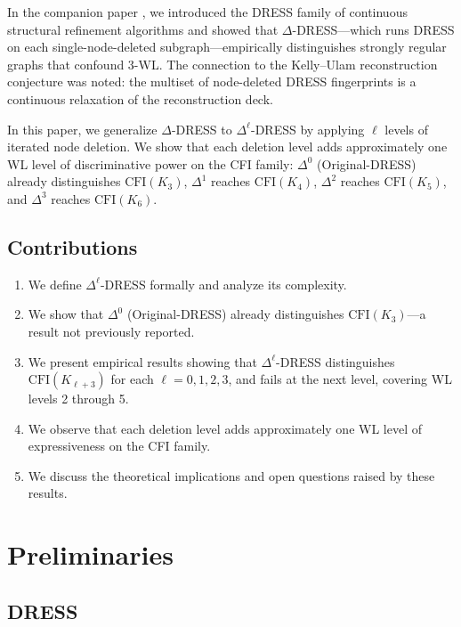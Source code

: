 \documentclass[11pt,a4paper]{article}
\begin{document}
In the companion paper \cite{castrillo2026dress}, we introduced the DRESS family of continuous structural refinement algorithms and showed that $\Delta$-DRESS---which runs DRESS on each single-node-deleted subgraph---empirically distinguishes strongly regular graphs that confound 3-WL. The connection to the Kelly--Ulam reconstruction conjecture \cite{kelly1942congruence, ulam1960collection} was noted: the multiset of node-deleted DRESS fingerprints is a continuous relaxation of the reconstruction deck.

In this paper, we generalize $\Delta$-DRESS to $\Delta^\ell$-DRESS by applying $\ell$ levels of iterated node deletion. We show that each deletion level adds approximately one WL level of discriminative power on the CFI family: $\Delta^0$ (Original-DRESS) already distinguishes $\text{CFI}(K_3)$, $\Delta^1$ reaches $\text{CFI}(K_4)$, $\Delta^2$ reaches $\text{CFI}(K_5)$, and $\Delta^3$ reaches $\text{CFI}(K_6)$.

\subsection{Contributions}
\begin{enumerate}
    \item We define $\Delta^\ell$-DRESS formally and analyze its complexity.
    \item We show that $\Delta^0$ (Original-DRESS) already distinguishes $\text{CFI}(K_3)$---a result not previously reported.
    \item We present empirical results showing that $\Delta^\ell$-DRESS distinguishes $\text{CFI}(K_{\ell+3})$ for each $\ell = 0, 1, 2, 3$, and fails at the next level, covering WL levels 2 through 5.
    \item We observe that each deletion level adds approximately one WL level of expressiveness on the CFI family.
    \item We discuss the theoretical implications and open questions raised by these results.
\end{enumerate}

\section{Preliminaries}

\subsection{DRESS}
\end{document}
